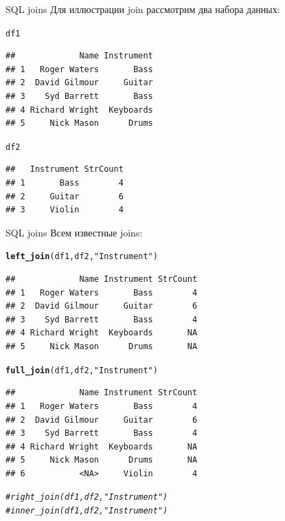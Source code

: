 \documentclass[compress, ucs]{beamer}\usepackage[]{graphicx}\usepackage[]{color}
\makeatletter
\newcommand{\hlstr}[1]{\textcolor[rgb]{0.192,0.494,0.8}{#1}}%
\newcommand{\hlcom}[1]{\textcolor[rgb]{0.678,0.584,0.686}{\textit{#1}}}%
\newcommand{\hlstd}[1]{\textcolor[rgb]{0.345,0.345,0.345}{#1}}%
\newcommand{\hlkwd}[1]{\textcolor[rgb]{0.737,0.353,0.396}{\textbf{#1}}}%
\newenvironment{kframe}{%
 \def\at@end@of@kframe{}%
 \ifinner\ifhmode%
  \def\at@end@of@kframe{\end{minipage}}%
  \begin{minipage}{\columnwidth}%
 \fi\fi%
 \def\FrameCommand##1{\hskip\@totalleftmargin \hskip-\fboxsep
 \colorbox{shadecolor}{##1}\hskip-\fboxsep
     \hskip-\linewidth \hskip-\@totalleftmargin \hskip\columnwidth}%
 \MakeFramed {\advance\hsize-\width
   \@totalleftmargin\z@ \linewidth\hsize
   \@setminipage}}%
 {\par\unskip\endMakeFramed%
 \at@end@of@kframe}
\newenvironment{knitrout}{}{} %
\makeatother
\begin{document}
\begin{frame}[fragile]{SQL joins}
Для иллюстрации join рассмотрим два набора данных:

\begin{knitrout}\scriptsize
{}\color{fgcolor}\begin{kframe}
\begin{alltt}
\hlstd{df1}
\end{alltt}
\begin{verbatim}
##             Name Instrument
## 1   Roger Waters       Bass
## 2  David Gilmour     Guitar
## 3    Syd Barrett       Bass
## 4 Richard Wright  Keyboards
## 5     Nick Mason      Drums
\end{verbatim}
\begin{alltt}
\hlstd{df2}
\end{alltt}
\begin{verbatim}
##   Instrument StrCount
## 1       Bass        4
## 2     Guitar        6
## 3     Violin        4
\end{verbatim}
\end{kframe}
\end{knitrout}
\end{frame}
\begin{frame}[fragile]{SQL joins}
Всем известные joins:
\begin{knitrout}\scriptsize
{}\color{fgcolor}\begin{kframe}
\begin{alltt}
\hlkwd{left_join}\hlstd{(df1, df2,} \hlstr{"Instrument"}\hlstd{)}
\end{alltt}
\begin{verbatim}
##             Name Instrument StrCount
## 1   Roger Waters       Bass        4
## 2  David Gilmour     Guitar        6
## 3    Syd Barrett       Bass        4
## 4 Richard Wright  Keyboards       NA
## 5     Nick Mason      Drums       NA
\end{verbatim}
\begin{alltt}
\hlkwd{full_join}\hlstd{(df1, df2,} \hlstr{"Instrument"}\hlstd{)}
\end{alltt}
\begin{verbatim}
##             Name Instrument StrCount
## 1   Roger Waters       Bass        4
## 2  David Gilmour     Guitar        6
## 3    Syd Barrett       Bass        4
## 4 Richard Wright  Keyboards       NA
## 5     Nick Mason      Drums       NA
## 6           <NA>     Violin        4
\end{verbatim}
\begin{alltt}
\hlcom{#right_join(df1, df2, "Instrument")}
\hlcom{#inner_join(df1, df2, "Instrument")}
\end{alltt}
\end{kframe}
\end{knitrout}
\end{frame}
\end{document}
